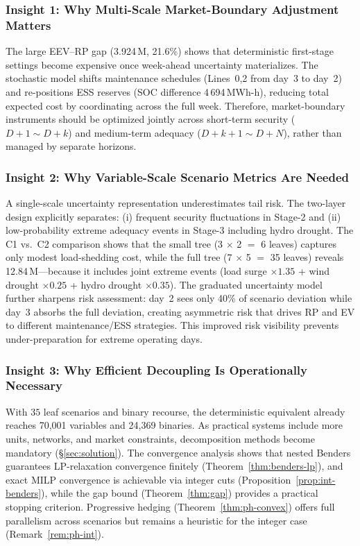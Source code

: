 \documentclass[11pt]{article}
\begin{document}
\subsubsection{Insight 1: Why Multi-Scale Market-Boundary Adjustment Matters}

The large EEV--RP gap (3.924\,M\textyen, 21.6\%) shows that
deterministic first-stage settings become expensive once week-ahead
uncertainty materializes. The stochastic model shifts maintenance
schedules (Lines~0,2 from day~3 to day~2) and re-positions ESS
reserves (SOC difference 4\,694\,MWh-h), reducing total expected
cost by coordinating across the full week. Therefore, market-boundary
instruments should be optimized jointly across short-term security
($D{+}1\sim D{+}k$) and medium-term adequacy
($D{+}k{+}1\sim D{+}N$), rather than managed by separate horizons.

\subsubsection{Insight 2: Why Variable-Scale Scenario Metrics Are Needed}

A single-scale uncertainty representation underestimates tail risk.
The two-layer design explicitly separates: (i) frequent security
fluctuations in Stage-2 and (ii) low-probability extreme adequacy
events in Stage-3 including hydro drought. The C1 vs.\ C2 comparison
shows that the small tree (3 $\times$ 2 $=$ 6 leaves) captures only
modest load-shedding cost, while the full tree
(7 $\times$ 5 $=$ 35 leaves) reveals 12.84\,M\textyen---because it
includes joint extreme events
(load surge $\times 1.35$ + wind drought $\times 0.25$ + hydro
drought $\times 0.35$). The graduated uncertainty model further
sharpens risk assessment: day~2 sees only 40\% of scenario deviation
while day~3 absorbs the full deviation, creating asymmetric risk
that drives RP and EV to different maintenance/ESS strategies.
This improved risk visibility prevents
under-preparation for extreme operating days.

\subsubsection{Insight 3: Why Efficient Decoupling Is Operationally Necessary}

With $35$ leaf scenarios and binary recourse, the deterministic
equivalent already reaches 70,001 variables and 24,369 binaries.
As practical systems include more units, networks, and market
constraints, decomposition methods become mandatory
(\S\ref{sec:solution}). The convergence analysis shows that
nested Benders guarantees LP-relaxation convergence finitely
(Theorem~\ref{thm:benders-lp}), and exact MILP convergence is
achievable via integer cuts (Proposition~\ref{prop:int-benders}),
while the gap bound (Theorem~\ref{thm:gap}) provides a practical
stopping criterion. Progressive hedging
(Theorem~\ref{thm:ph-convex}) offers full parallelism across
scenarios but remains a heuristic for the integer case
(Remark~\ref{rem:ph-int}).
\end{document}
